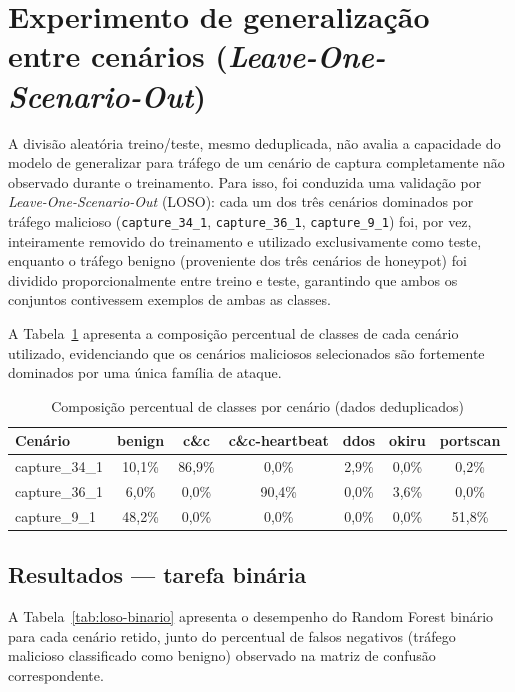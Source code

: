 \section{Experimento de generalização entre cenários (\textit{Leave-One-Scenario-Out})}
\label{sec:loso}

A divisão aleatória treino/teste, mesmo deduplicada, não avalia a capacidade do modelo de generalizar para tráfego de um cenário de captura completamente não observado durante o treinamento. Para isso, foi conduzida uma validação por \textit{Leave-One-Scenario-Out} (LOSO): cada um dos três cenários dominados por tráfego malicioso (\texttt{capture\_34\_1}, \texttt{capture\_36\_1}, \texttt{capture\_9\_1}) foi, por vez, inteiramente removido do treinamento e utilizado exclusivamente como teste, enquanto o tráfego benigno (proveniente dos três cenários de honeypot) foi dividido proporcionalmente entre treino e teste, garantindo que ambos os conjuntos contivessem exemplos de ambas as classes.

A Tabela~\ref{tab:composicao-cenarios} apresenta a composição percentual de classes de cada cenário utilizado, evidenciando que os cenários maliciosos selecionados são fortemente dominados por uma única família de ataque.

\begin{table}[htbp]
\centering
\caption{Composição percentual de classes por cenário (dados deduplicados)}
\label{tab:composicao-cenarios}
\begin{tabular}{@{}lcccccc@{}}
\toprule
\textbf{Cenário} & benign & c\&c & c\&c-heartbeat & ddos & okiru & portscan \\
\midrule
capture\_34\_1 & 10{,}1\% & 86{,}9\% & 0{,}0\% & 2{,}9\% & 0{,}0\% & 0{,}2\% \\
capture\_36\_1 & 6{,}0\% & 0{,}0\% & 90{,}4\% & 0{,}0\% & 3{,}6\% & 0{,}0\% \\
capture\_9\_1 & 48{,}2\% & 0{,}0\% & 0{,}0\% & 0{,}0\% & 0{,}0\% & 51{,}8\% \\
\bottomrule
\end{tabular}
\end{table}

\subsection{Resultados — tarefa binária}

A Tabela~\ref{tab:loso-binario} apresenta o desempenho do Random Forest binário para cada cenário retido, junto do percentual de falsos negativos (tráfego malicioso classificado como benigno) observado na matriz de confusão correspondente.

